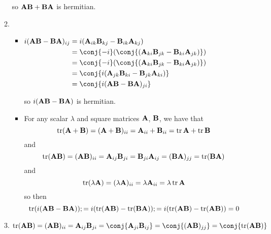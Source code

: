 \documentclass[fleqn,a4paper,11pt]{article}
\begin{document}
\begin{enumerate}[label=\textbf{\arabic*.}]
\begin{enumerate}[label=(\roman*)]
     so \(\mathbf{A}\mathbf{B} + \mathbf{B}\mathbf{A}\) is hermitian.
    \item
     \begin{itemize}
      \item \(
       \begin{aligned}[t]
        i(\mat A\mat B - \mat B\mat A)_{ij}
         &= i(\mat A_{ik} \mat B_{kj} - \mat B_{ik} \mat A_{kj}) \\
         &= \conj{-i}(\conj{(\mat A_{ki} \mat B_{jk}
           - \mat B_{ki} \mat A_{jk})}) \\
         &= \conj{-i}(\conj{(\mat A_{ki} \mat B_{jk}
           - \mat B_{ki} \mat A_{jk})}) \\
         &= \conj{i(\mat A_{jk} \mat B_{ki} - \mat B_{jk} \mat A_{ki})} \\
         &= \conj{i(\mat A\mat B - \mat B\mat A)_{ji}}
       \end{aligned}\)

       so \(i(\mathbf{A}\mathbf{B} - \mathbf{B}\mathbf{A})\) is hermitian.
      \item
       For any scalar \(\lambda\) and square matrices \(\mathbf{A}\), \(\mathbf{B}\), we
       have that
       \begin{equation*}
        \operatorname{tr}(\mathbf{A} + \mathbf{B})
         = (\mathbf{A} + \mathbf{B})_{ii}
         = \mathbf{A}_{ii} + \mathbf{B}_{ii}
         = \operatorname{tr}\mathbf{A} + \operatorname{tr}\mathbf{B}
       \end{equation*}
       and
       \begin{equation*}
        \operatorname{tr}(\mathbf{A}\mathbf{B})
        = (\mathbf{A}\mathbf{B})_{ii}
        = \mathbf{A}_{ij} \mathbf{B}_{ji}
        = \mathbf{B}_{ji} \mathbf{A}_{ij}
        = (\mathbf{B}\mathbf{A})_{jj}
         = \operatorname{tr}(\mathbf{B}\mathbf{A})
       \end{equation*}
       and
       \begin{equation*}
        \operatorname{tr}(\lambda \mathbf{A})
        = (\lambda \mathbf{A})_{ii}
        = \lambda \mathbf{A}_{ii}
        = \lambda \operatorname{tr}\mathbf{A}
       \end{equation*}
       so then
       \begin{equation*}
        \operatorname{tr}(i(\mathbf{A}\mathbf{B} - \mathbf{B}\mathbf{A}));
        = i(\operatorname{tr}(\mathbf{A}\mathbf{B}) - \operatorname{tr}(\mathbf{B}\mathbf{A}));
        = i(\operatorname{tr}(\mathbf{A}\mathbf{B}) - \operatorname{tr}(\mathbf{A}\mathbf{B})) = 0
       \end{equation*}
     \end{itemize}
    \item \(
      \tr(\mat A\mat B)
      = (\mat A\mat B)_{ii}
      = \mat A_{ij} \mat B_{ji}
      = \conj{\mat A_{ji} \mat B_{ij}}
      = \conj{(\mat A\mat B)_{jj}} = \conj{\tr(\mat A\mat B)}
      \)


\end{enumerate}
\end{enumerate}
\end{document}
